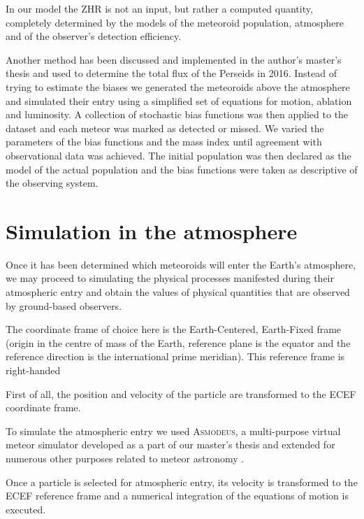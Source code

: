             In our model the ZHR is not an input, but rather a computed quantity, completely determined by the
            models of the meteoroid population, atmosphere and of the observer's detection efficiency.



    Another method has been discussed and implemented in the author's master's thesis \citep{balaz-thesis}
    and used to determine the total flux of the Perseids in 2016. Instead of trying to
    estimate the biases we generated the meteoroids above the atmosphere and simulated
    their entry using a simplified set of equations for motion, ablation and luminosity.
    A collection of stochastic bias functions was then applied to the dataset and
    each meteor was marked as detected or missed. We varied the parameters of the bias functions
    and the mass index until agreement with observational data was achieved.
    The initial population was then declared as the model of the actual population
    and the bias functions were taken as descriptive of the observing system.


\section{Simulation in the atmosphere} \label{ma}
    Once it has been determined which meteoroids will enter the Earth's atmosphere, we may proceed to simulating
    the physical processes manifested during their atmospheric entry and obtain the values of physical quantities
    that are observed by ground-based observers.

    The coordinate frame of choice here is the Earth-Centered, Earth-Fixed frame (origin in the centre of mass of the Earth,
    reference plane is the equator and the reference direction is the international prime meridian).
    This reference frame is right-handed

    First of all, the position and velocity of the particle are transformed to the ECEF coordinate frame.

    To simulate the atmospheric entry we used \textsc{Asmodeus},
    a multi-purpose virtual meteor simulator developed as a part of our master's thesis and extended for numerous
    other purposes related to meteor astronomy \citep{balaz-thesis,balaz+2020}.

    Once a particle is selected for atmospheric entry, its velocity is transformed to the ECEF reference frame
    and a numerical integration of the equations of motion is executed.

